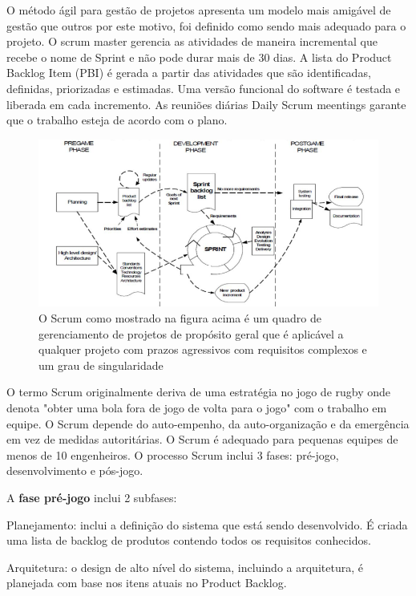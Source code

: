 \documentclass[12pt]{article}
\begin{document}
O método ágil para gestão de projetos apresenta um modelo mais amigável de gestão que outros por este motivo, foi definido como sendo mais adequado para o projeto. O scrum master gerencia as atividades de maneira incremental que recebe o nome de Sprint e não pode durar mais de 30 dias. A lista do Product Backlog Item (PBI) é gerada a partir das atividades que são identificadas, definidas, priorizadas e estimadas. Uma versão funcional do software é testada e liberada em cada incremento. As reuniões diárias Daily Scrum meentings garante que o trabalho esteja de acordo com o plano. \cite{Bourque2014}

\begin{figure}[htp]
\centering
\includegraphics[width=.9\textwidth]{ScrumModel.png}
\caption{O Scrum como mostrado na figura acima é um quadro de gerenciamento de projetos de propósito geral que é aplicável a qualquer projeto com prazos agressivos com requisitos complexos e um grau de singularidade \cite{rees2002feasible}}
\label{fig:exampleFig3}
\end{figure}

O termo Scrum originalmente deriva de uma estratégia no jogo de rugby onde denota "obter uma bola fora de jogo de volta para o jogo" com o trabalho em equipe. O Scrum depende do auto-empenho, da auto-organização e da emergência em vez de medidas autoritárias. O Scrum é adequado para pequenas equipes de menos de 10 engenheiros. O processo Scrum inclui 3 fases: pré-jogo, desenvolvimento e pós-jogo.

A \textbf{fase pré-jogo} inclui 2 subfases:
    
Planejamento: inclui a definição do sistema que está sendo desenvolvido. É criada uma lista de backlog de produtos contendo todos os requisitos conhecidos.

Arquitetura: o design de alto nível do sistema, incluindo a arquitetura, é planejada com base nos itens atuais no Product Backlog.
    
\end{document}
